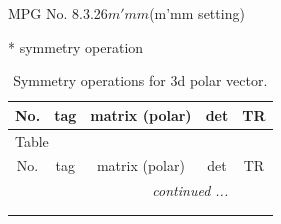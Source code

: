 \documentclass[fleqn,8pt]{jsarticle}
\begin{document}
\setcounter{MaxMatrixCols}{32}

\renewcommand{\tablename}{Table~}
\renewcommand{\figurename}{Figure~}
\begin{center}
\LARGE
MPG No. 8.3.26\quad$m'mm$\quad(m'mm setting)
\end{center}
* symmetry operation
\renewcommand{\arraystretch}{1.3}
\begin{longtable}{ccccc}
\caption{Symmetry operations for 3d polar vector.}
 \\
 \hline \hline
No. & tag & matrix (polar) & det & TR \\ \hline \endfirsthead

\multicolumn{4}{l}{\tablename\ \thetable{}} \\
 \hline \hline
No. & tag & matrix (polar) & det & TR \\ \hline \endhead

 \hline \hline
\multicolumn{4}{r}{\footnotesize\it continued ...} \\ \endfoot

 \hline \hline
\multicolumn{4}{r}{} \\ \endlastfoot


\end{longtable}
\end{document}
